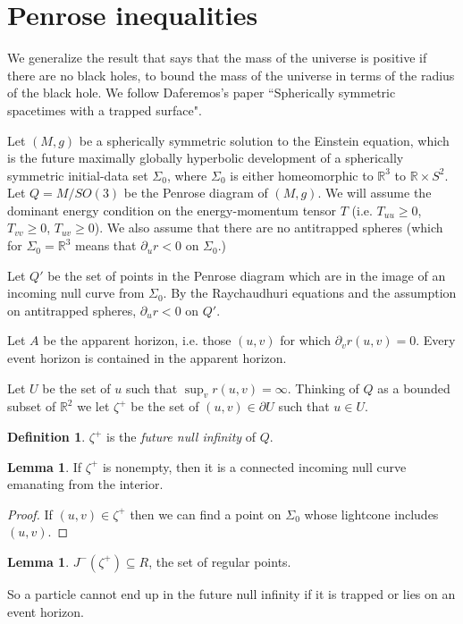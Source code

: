 \documentclass[12pt]{report}
\newcommand{\RR}{\mathbb{R}}
\newcommand{\dfn}[1]{\emph{#1}\index{#1}}
\theoremstyle{definition}
\newtheorem{lemma}[theorem]{Lemma}
\newtheorem{definition}[theorem]{Definition}
\begin{document}
\section{Penrose inequalities}
We generalize the result that says that the mass of the universe is positive if there are no black holes, to bound the mass of the universe in terms of the radius of the black hole. We follow Daferemos's paper ``Spherically symmetric spacetimes with a trapped surface".

Let $(M, g)$ be a spherically symmetric solution to the Einstein equation, which is the future maximally globally hyperbolic development of a spherically symmetric initial-data set $\Sigma_0$, where $\Sigma_0$ is either homeomorphic to $\RR^3$ to $\RR \times S^2$. Let $Q = M/SO(3)$ be the Penrose diagram of $(M, g)$. We will assume the dominant energy condition on the energy-momentum tensor $T$ (i.e. $T_{uu} \geq 0$, $T_{vv} \geq 0$, $T_{uv} \geq 0$). We also assume that there are no antitrapped spheres (which for $\Sigma_0 = \RR^3$ means that $\partial_ur < 0$ on $\Sigma_0$.)

Let $Q'$ be the set of points in the Penrose diagram which are in the image of an incoming null curve from $\Sigma_0$. By the Raychaudhuri equations and the assumption on antitrapped spheres, $\partial_ur < 0$ on $Q'$.

Let $A$ be the apparent horizon, i.e. those $(u, v)$ for which $\partial_vr(u, v) = 0$. Every event horizon is contained in the apparent horizon.

Let $U$ be the set of $u$ such that $\sup_v r(u, v) = \infty$. Thinking of $Q$ as a bounded subset of $\RR^2$ we let $\zeta^+$ be the set of $(u,v) \in \partial U$ such that $u \in U$.
\begin{definition}
    $\zeta^+$ is the \dfn{future null infinity} of $Q$.
\end{definition}
\begin{lemma}
    If $\zeta^+$ is nonempty, then it is a connected incoming null curve emanating from the interior.
\end{lemma}
\begin{proof}
    If $(u, v) \in \zeta^+$ then we can find a point on $\Sigma_0$ whose lightcone includes $(u, v)$.
\end{proof}
\begin{lemma}
    $J^-(\zeta^+) \subseteq R$, the set of regular points.
\end{lemma}
    So a particle cannot end up in the future null infinity if it is trapped or lies on an event horizon.
\end{document}
